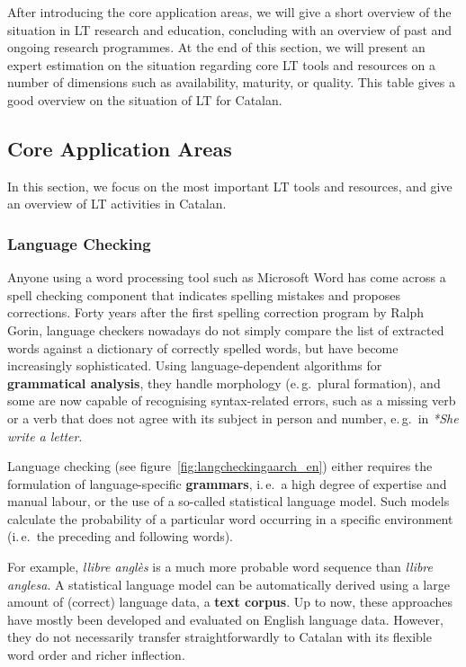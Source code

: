 \begin{multicols}{2}
After introducing the core application areas, we will give a short overview of the situation in LT research and education, concluding with an overview of past and ongoing research programmes. At the end of this section, we will present an expert estimation on the situation regarding core LT tools and resources on a number of dimensions such as availability, maturity, or quality. This table gives a good overview on the situation of LT for Catalan.


\subsection{Core Application Areas}

    In this section, we focus on the most important LT tools and resources, and give an overview of LT activities in Catalan. 

\subsubsection{Language Checking}

Anyone using a word processing tool such as Microsoft Word has come across a spell checking component that indicates spelling mistakes and proposes corrections. Forty years after the first spelling correction program by Ralph Gorin, language checkers nowadays do not simply compare the list of extracted words against a dictionary of correctly spelled words, but have become increasingly sophisticated. Using language-dependent algorithms for \textbf{grammatical analysis}, they handle morphology (e.\,g.~plural formation), and some are now capable of recognising syntax-related errors, such as a missing verb or a verb that does not agree with its subject in person and number, e.\,g.~in \textit{*She write a letter}. 

Language checking (see figure~\ref{fig:langcheckingaarch_en}) either requires the formulation of language-specific \textbf{grammars}, i.\,e.~a high degree of expertise and manual labour, or the use of a so-called statistical language model. Such models calculate the probability of a particular word occurring in a specific environment (i.\,e.~the preceding and following words).

For example, \textit{llibre anglès} is a much more probable word sequence than \textit{llibre anglesa}. A statistical language model can be automatically derived using a large amount of (correct) language data, a \textbf{text corpus}. Up to now, these approaches have mostly been developed and evaluated on English language data. However, they do not necessarily transfer straightforwardly to Catalan with its flexible word order and richer inflection. 



\end{multicols}
